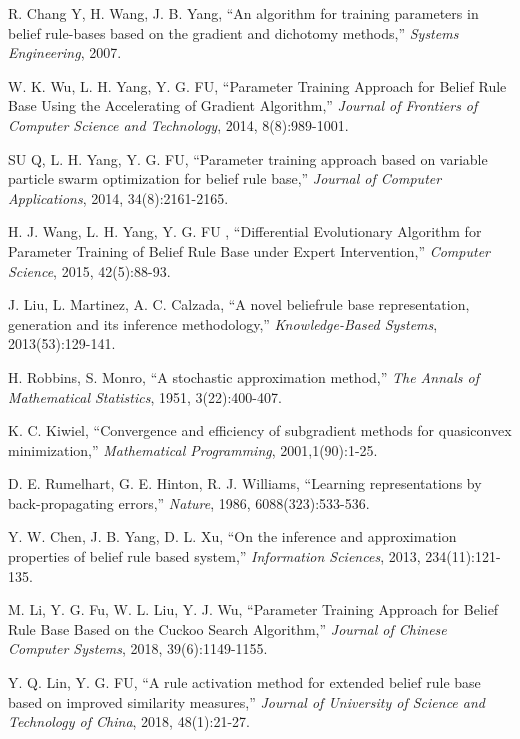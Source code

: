 \documentclass{ieeeaccess}
\begin{document}
\begin{thebibliography}{00}
     R. Chang Y, H. Wang, J. B. Yang, ``An algorithm for training parameters
    in belief rule-bases based on the gradient and dichotomy methods,''
    \emph{Systems Engineering},
    2007.

     W. K. Wu, L. H. Yang, Y. G. FU, ``Parameter Training Approach for Belief Rule Base Using the Accelerating of Gradient
    Algorithm,''
    \emph{Journal of Frontiers of Computer Science and Technology},
    2014, 8(8):989-1001.

     SU Q, L. H. Yang, Y. G. FU, ``Parameter training approach based on variable particle swarm optimization
    for belief rule base,''
    \emph{Journal of Computer Applications},
    2014, 34(8):2161-2165.

     H. J. Wang, L. H. Yang, Y. G. FU , ``Differential Evolutionary Algorithm for Parameter Training of Belief Rule Base under Expert Intervention,''
    \emph{Computer Science},
    2015, 42(5):88-93.

     J. Liu, L. Martinez, A. C. Calzada, ``A novel beliefrule base representation, generation and its inference methodology,''
    \emph{Knowledge-Based Systems},
    2013(53):129-141.

     H. Robbins, S. Monro, ``A stochastic approximation method,''
    \emph{The Annals of Mathematical Statistics},
    1951, 3(22):400-407.

     K. C. Kiwiel, ``Convergence and efficiency of subgradient methods for quasiconvex minimization,''
    \emph{Mathematical Programming},
    2001,1(90):1-25.

     D. E. Rumelhart, G. E. Hinton, R. J. Williams, ``Learning representations
    by back-propagating errors,''
    \emph{Nature},
    1986, 6088(323):533-536.

     Y. W. Chen, J. B. Yang, D. L. Xu, ``On the inference and approximation properties of belief rule based system,''
    \emph{Information Sciences}, 2013, 234(11):121-135.

     M. Li, Y. G. Fu, W. L. Liu, Y. J. Wu, ``Parameter Training  Approach for Belief Rule Base Based on the Cuckoo Search Algorithm,''
    \emph{Journal of Chinese Computer Systems}, 2018, 39(6):1149-1155.

     Y. Q. Lin, Y. G. FU, ``A rule activation method for extended belief rule base based on improved similarity measures,''
    \emph{Journal of University of Science and Technology of China},
    2018, 48(1):21-27.


\end{thebibliography}
\end{document}
